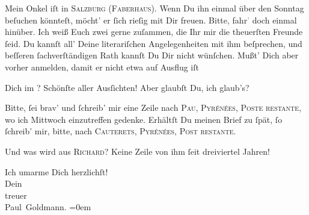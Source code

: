 \pstart
           Mein Onkel iſt in \textsc{Salzburg} (\textsc{Faberhaus}). {\pb}Wenn Du ihn einmal über den Sonntag
               beſuchen könnteſt, möcht’ er ſich rieſig mit Dir freuen. Bitte,
                  fahr\textcolor{gray}{’} doch einmal hinüber. Ich weiß Euch zwei gerne zuſammen,
               die Ihr mir die theuerſten Freunde ſeid. Du kannſt all’ Deine literariſchen Angelegenheiten mit ihm
               beſprechen, und beſſeren ſachverſtändigen Rath kannſt Du Dir {\pb}nicht wünſchen. Mußt’ Dich aber vorher anmelden,
               damit er nicht etwa auf Ausflug iſt{\dotsfour}\pend
           
\pstart
           Dich im \label{K_L02701-6v}\label{K_L02701-6}? Schönſte aller Ausſichten! Aber
               glaubſt Du, ich glaub’s? {\dotsfour}\pend
           
\pstart
           Bitte, ſei brav’ und ſchreib’ mir eine Zeile nach \textsc{Pau}, \textsc{Pyrénées}, \textsc{Poste restante}, wo ich Mittwoch einzutreffen gedenke. Erhältſt Du {\pb}meinen Brief zu ſpät, ſo ſchreib’ mir, bitte, nach
                  \textsc{Cauterets}, \textsc{}{ }\textsc{Pyrénées}, \textsc{Post restante}.\pend
           
\pstart
           Und was wird aus \textsc{Richard}? Keine Zeile von ihm ſeit dreiviertel Jahren!\pend
           
\pstart
           Ich umarme Dich herzlichſt! {\\[\baselineskip]}Dein {\\[\baselineskip]}treuer {\\[\baselineskip]}\spacefill\mbox{Paul Goldmann.}\pend
           \leftskip=0em{}\endnumbering{}  
      